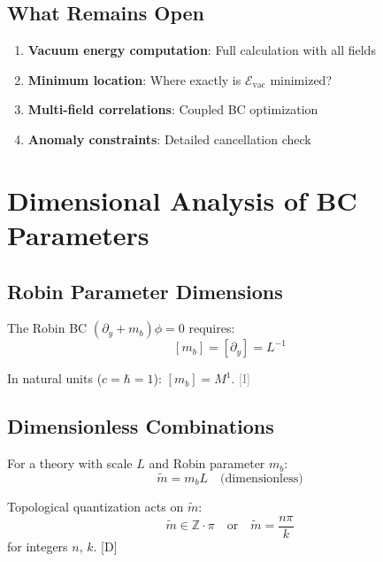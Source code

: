 \documentclass[11pt,a4paper]{article}
\newcommand{\tagD}{\textcolor{blue!70!black}{[D]}}
\newcommand{\tagI}{\textcolor{gray}{[I]}}
\begin{document}
\subsection{What Remains Open}

\begin{enumerate}
    \item \textbf{Vacuum energy computation}: Full calculation with all fields
    \item \textbf{Minimum location}: Where exactly is $\mathcal{E}_{\text{vac}}$ minimized?
    \item \textbf{Multi-field correlations}: Coupled BC optimization
    \item \textbf{Anomaly constraints}: Detailed cancellation check
\end{enumerate}

\section{Dimensional Analysis of BC Parameters}

\subsection{Robin Parameter Dimensions}

The Robin BC $(\partial_y + m_b)\phi = 0$ requires:
\begin{equation}
\label{eq:dim-robin}
[m_b] = [\partial_y] = L^{-1}
\end{equation}

In natural units ($c = \hbar = 1$): $[m_b] = M^1$. \tagI

\subsection{Dimensionless Combinations}

For a theory with scale $L$ and Robin parameter $m_b$:
\begin{equation}
\label{eq:dim-combo}
\tilde{m} = m_b L \quad \text{(dimensionless)}
\end{equation}

Topological quantization acts on $\tilde{m}$:
\begin{equation}
\label{eq:dim-quant}
\tilde{m} \in \mathbb{Z} \cdot \pi \quad \text{or} \quad \tilde{m} = \frac{n\pi}{k}
\end{equation}
for integers $n$, $k$. \tagD
\end{document}
